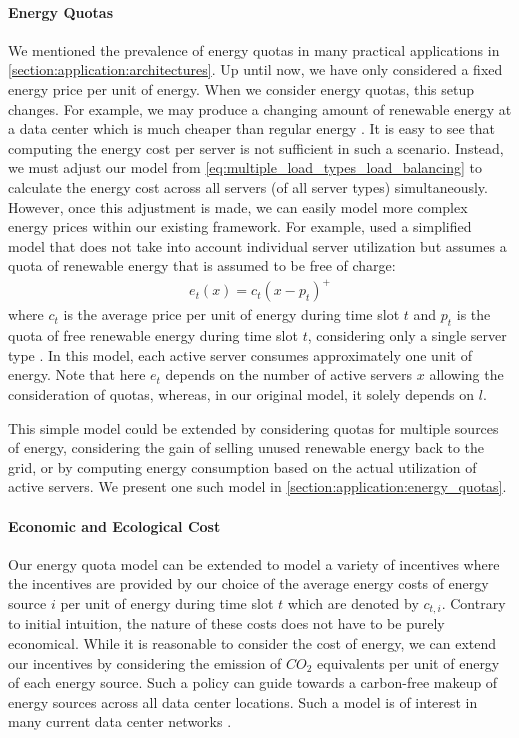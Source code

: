\paragraph{Energy Quotas} We mentioned the prevalence of energy quotas in many practical applications in \autoref{section:application:architectures}. Up until now, we have only considered a fixed energy price per unit of energy. When we consider energy quotas, this setup changes. For example, we may produce a changing amount of renewable energy at a data center which is much cheaper than regular energy \cite{Lin2012}. It is easy to see that computing the energy cost per server is not sufficient in such a scenario. Instead, we must adjust our model from \autoref{eq:multiple_load_types_load_balancing} to calculate the energy cost across all servers (of all server types) simultaneously. However, once this adjustment is made, we can easily model more complex energy prices within our existing framework. For example, \citeauthor*{Lin2012} used a simplified model that does not take into account individual server utilization but assumes a quota of renewable energy that is assumed to be free of charge: \begin{align*}
    e_t(x) = c_{t}(x - p_t)^+
\end{align*} where $c_t$ is the average price per unit of energy during time slot $t$ and $p_t$ is the quota of free renewable energy during time slot $t$, considering only a single server type \cite{Lin2012}. In this model, each active server consumes approximately one unit of energy. Note that here $e_t$ depends on the number of active servers $x$ allowing the consideration of quotas, whereas, in our original model, it solely depends on $l$.

This simple model could be extended by considering quotas for multiple sources of energy, considering the gain of selling unused renewable energy back to the grid, or by computing energy consumption based on the actual utilization of active servers. We present one such model in \autoref{section:application:energy_quotas}.

\paragraph{Economic and Ecological Cost} Our energy quota model can be extended to model a variety of incentives where the incentives are provided by our choice of the average energy costs of energy source $i$ per unit of energy during time slot $t$ which are denoted by $c_{t,i}$. Contrary to initial intuition, the nature of these costs does not have to be purely economical. While it is reasonable to consider the cost of energy, we can extend our incentives by considering the emission of $CO_2$ equivalents per unit of energy of each energy source. Such a policy can guide towards a carbon-free makeup of energy sources across all data center locations. Such a model is of interest in many current data center networks \cite{Hölzle2020, Miller2021}.


